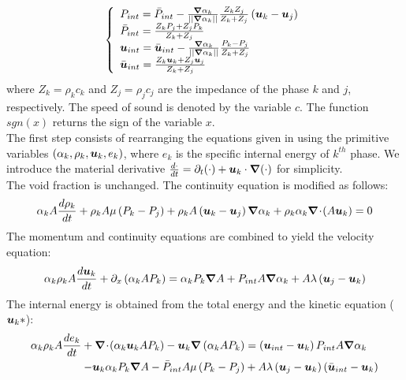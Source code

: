 \begin{equation}
\label{eq:sev_equ2-app}
\left\{
\begin{array}{lll}
P_{int} = \bar{P}_{int} - \frac{\boldsymbol{\nabla} \alpha_k}{|| \boldsymbol{\nabla} \alpha_k ||} \frac{Z_k Z_j}{Z_k + Z_j} \left( \boldsymbol u_k-\boldsymbol u_j \right) \\
\bar{P}_{int} = \frac{Z_k P_j + Z_j P_k}{Z_k + Z_j} \\
\boldsymbol u_{int} = \bar{\boldsymbol u}_{int} - \frac{\boldsymbol{\nabla} \alpha_k}{|| \boldsymbol{\nabla} \alpha_k ||} \frac{P_k - P_j}{Z_k + Z_j} \\
\bar{\boldsymbol u}_{int} = \frac{Z_k \boldsymbol u _k + Z_j \boldsymbol u_j}{Z_k + Z_j}
\end{array}
\right.
\end{equation}
where $Z_k = \rho_k c_k$ and $Z_j = \rho_j c_j$ are the impedance of the phase $k$ and $j$, respectively. The speed of sound is denoted by the variable $c$. The function $sgn(x)$ returns the sign of the variable $x$.\\
The first step consists of rearranging the equations given in  using the primitive variables $(\alpha_k, \rho_k, \boldsymbol u_k, e_k)$, where $e_k$ is the specific internal energy of $k^{th}$ phase. We introduce the material derivative $\frac{d \cdot}{dt} = \partial_t (\cdot) + \boldsymbol u_k \cdot \boldsymbol{\nabla} (\cdot)$ for simplicity. \\
The void fraction is unchanged. The continuity equation is modified as follows:
\begin{equation}
\label{eq:cont1-app}
\alpha_k A \frac{d \rho_k}{dt} + \rho_k A \mu \left( P_k-P_j \right) + \rho_k A \left( \boldsymbol u_k-\boldsymbol u_j \right) \boldsymbol{\nabla} \alpha_k + \rho_k \alpha_k \boldsymbol{\nabla}\! \cdot \! \left( A \boldsymbol u_k \right) = 0
\end{equation}
The momentum and continuity equations are combined to yield the velocity equation:
\begin{equation}
\label{eq:vel1-app}
\alpha_k \rho_k A \frac{d\boldsymbol u_k}{dt} + \partial_x \left( \alpha_k A P_k \right) = \alpha_k P_k \boldsymbol{\nabla} A + P_{int} A \boldsymbol{\nabla} \alpha_k + A \lambda \left( \boldsymbol u_j-\boldsymbol u_k \right)
\end{equation}
The internal energy is obtained from the total energy and the kinetic equation ($\boldsymbol u_k * $):
\begin{align}\label{eq:internal1}
\alpha_k \rho_k A \frac{d e_k}{dt} + \boldsymbol{\nabla}\! \cdot \!\left( \alpha_k \boldsymbol u_k A P_k \right) - \boldsymbol u_k \boldsymbol{\nabla} \left( \alpha_k A P_k \right) &= \left(\boldsymbol u_{int}-\boldsymbol u_k \right) P_{int} A \boldsymbol{\nabla} \alpha_k \nonumber \\
- \boldsymbol u_k \alpha_k P_k \boldsymbol{\nabla} A 
 - \bar{P}_{int} A \mu \left(P_k-P_j \right) &+ A \lambda \left(\boldsymbol u_j-\boldsymbol u_k  \right) \left(\bar{\boldsymbol u}_{int}-\boldsymbol u_k \right)
\end{align}
